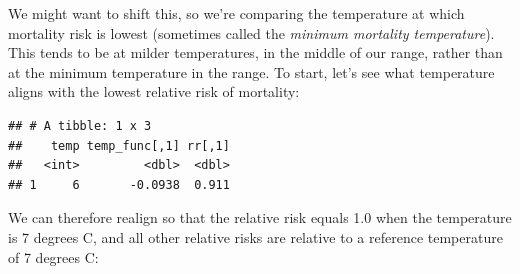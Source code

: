 \documentclass[
]{book}
\newenvironment{Shaded}{\begin{snugshade}}{\end{snugshade}}
\newcommand{\DataTypeTok}[1]{\textcolor[rgb]{0.13,0.29,0.53}{#1}}
\newcommand{\DecValTok}[1]{\textcolor[rgb]{0.00,0.00,0.81}{#1}}
\newcommand{\FloatTok}[1]{\textcolor[rgb]{0.00,0.00,0.81}{#1}}
\newcommand{\KeywordTok}[1]{\textcolor[rgb]{0.13,0.29,0.53}{\textbf{#1}}}
\newcommand{\NormalTok}[1]{#1}
\newcommand{\OperatorTok}[1]{\textcolor[rgb]{0.81,0.36,0.00}{\textbf{#1}}}
\newcommand{\StringTok}[1]{\textcolor[rgb]{0.31,0.60,0.02}{#1}}
\begin{document}
We might want to shift this, so we're comparing the temperature at which mortality risk
is lowest (sometimes called the \emph{minimum mortality temperature}). This tends to be at
milder temperatures, in the middle of our range, rather than at the minimum temperature in
the range. To start, let's see what temperature aligns with the lowest relative risk of
mortality:

\begin{Shaded}
\end{Shaded}

\begin{verbatim}
## # A tibble: 1 x 3
##    temp temp_func[,1] rr[,1]
##   <int>         <dbl>  <dbl>
## 1     6       -0.0938  0.911
\end{verbatim}

We can therefore realign so that the relative risk equals 1.0 when the temperature is 7 degrees
C, and all other relative risks are relative to a reference temperature of 7 degrees C:

\begin{Shaded}
\end{Shaded}
\end{document}
